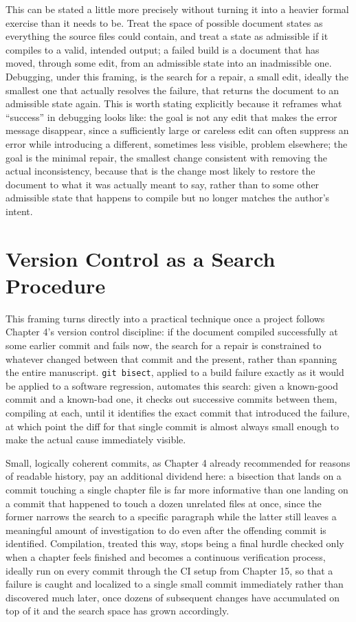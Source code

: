 This can be stated a little more precisely without turning it into a heavier formal exercise than it needs to be. Treat the space of possible document states as everything the source files could contain, and treat a state as admissible if it compiles to a valid, intended output; a failed build is a document that has moved, through some edit, from an admissible state into an inadmissible one. Debugging, under this framing, is the search for a repair, a small edit, ideally the smallest one that actually resolves the failure, that returns the document to an admissible state again. This is worth stating explicitly because it reframes what ``success'' in debugging looks like: the goal is not any edit that makes the error message disappear, since a sufficiently large or careless edit can often suppress an error while introducing a different, sometimes less visible, problem elsewhere; the goal is the minimal repair, the smallest change consistent with removing the actual inconsistency, because that is the change most likely to restore the document to what it was actually meant to say, rather than to some other admissible state that happens to compile but no longer matches the author's intent.

\hypertarget{version-control-as-a-search-procedure}{%
\section{Version Control as a Search Procedure}\label{version-control-as-a-search-procedure}}

This framing turns directly into a practical technique once a project follows Chapter 4's version control discipline: if the document compiled successfully at some earlier commit and fails now, the search for a repair is constrained to whatever changed between that commit and the present, rather than spanning the entire manuscript. \texttt{git\ bisect}, applied to a build failure exactly as it would be applied to a software regression, automates this search: given a known-good commit and a known-bad one, it checks out successive commits between them, compiling at each, until it identifies the exact commit that introduced the failure, at which point the diff for that single commit is almost always small enough to make the actual cause immediately visible.

Small, logically coherent commits, as Chapter 4 already recommended for reasons of readable history, pay an additional dividend here: a bisection that lands on a commit touching a single chapter file is far more informative than one landing on a commit that happened to touch a dozen unrelated files at once, since the former narrows the search to a specific paragraph while the latter still leaves a meaningful amount of investigation to do even after the offending commit is identified. Compilation, treated this way, stops being a final hurdle checked only when a chapter feels finished and becomes a continuous verification process, ideally run on every commit through the CI setup from Chapter 15, so that a failure is caught and localized to a single small commit immediately rather than discovered much later, once dozens of subsequent changes have accumulated on top of it and the search space has grown accordingly.

